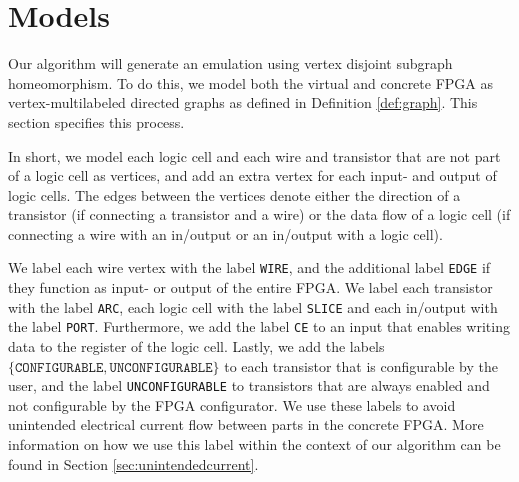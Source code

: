 \chapter{Models}
\label{chapter:models}
Our algorithm will generate an emulation using vertex disjoint subgraph homeomorphism. To do this, we model both the virtual and concrete FPGA as vertex-multilabeled directed graphs as defined in Definition \ref{def:graph}. This section specifies this process.

In short, we model each logic cell and each wire and transistor that are not part of a logic cell as vertices, and add an extra vertex for each input- and output of logic cells. The edges between the vertices denote either the direction of a transistor (if connecting a transistor and a wire) or the data flow of a logic cell (if connecting a wire with an in/output or an in/output with a logic cell).

We label each wire vertex with the label \texttt{WIRE}, and the additional label \texttt{EDGE} if they function as input- or output of the entire FPGA. We label each transistor with the label \texttt{ARC}, each logic cell with the label \texttt{SLICE} and each in/output with the label \texttt{PORT}. Furthermore, we add the label \texttt{CE} to an input that enables writing data to the register of the logic cell. Lastly, we add the labels $\{\mathtt{CONFIGURABLE}, \mathtt{UNCONFIGURABLE}\}$ to each transistor that is configurable by the user, and the label \texttt{UNCONFIGURABLE} to transistors that are always enabled and not configurable by the FPGA configurator. We use these labels to avoid unintended electrical current flow between parts in the concrete FPGA. More information on how we use this label within the context of our algorithm can be found in Section \ref{sec:unintendedcurrent}.